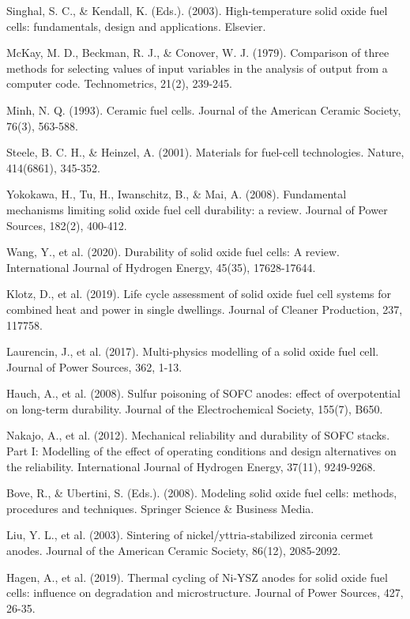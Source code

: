 \documentclass[10pt,conference]{IEEEtran}
\begin{document}
\begin{thebibliography}{99}

 Singhal, S. C., \& Kendall, K. (Eds.). (2003). High-temperature solid oxide fuel cells: fundamentals, design and applications. Elsevier.

 McKay, M. D., Beckman, R. J., \& Conover, W. J. (1979). Comparison of three methods for selecting values of input variables in the analysis of output from a computer code. Technometrics, 21(2), 239-245.

 Minh, N. Q. (1993). Ceramic fuel cells. Journal of the American Ceramic Society, 76(3), 563-588.

 Steele, B. C. H., \& Heinzel, A. (2001). Materials for fuel-cell technologies. Nature, 414(6861), 345-352.

 Yokokawa, H., Tu, H., Iwanschitz, B., \& Mai, A. (2008). Fundamental mechanisms limiting solid oxide fuel cell durability: a review. Journal of Power Sources, 182(2), 400-412.

 Wang, Y., et al. (2020). Durability of solid oxide fuel cells: A review. International Journal of Hydrogen Energy, 45(35), 17628-17644.

 Klotz, D., et al. (2019). Life cycle assessment of solid oxide fuel cell systems for combined heat and power in single dwellings. Journal of Cleaner Production, 237, 117758.

 Laurencin, J., et al. (2017). Multi-physics modelling of a solid oxide fuel cell. Journal of Power Sources, 362, 1-13.

 Hauch, A., et al. (2008). Sulfur poisoning of SOFC anodes: effect of overpotential on long-term durability. Journal of the Electrochemical Society, 155(7), B650.

 Nakajo, A., et al. (2012). Mechanical reliability and durability of SOFC stacks. Part I: Modelling of the effect of operating conditions and design alternatives on the reliability. International Journal of Hydrogen Energy, 37(11), 9249-9268.

 Bove, R., \& Ubertini, S. (Eds.). (2008). Modeling solid oxide fuel cells: methods, procedures and techniques. Springer Science \& Business Media.

 Liu, Y. L., et al. (2003). Sintering of nickel/yttria-stabilized zirconia cermet anodes. Journal of the American Ceramic Society, 86(12), 2085-2092.

 Hagen, A., et al. (2019). Thermal cycling of Ni-YSZ anodes for solid oxide fuel cells: influence on degradation and microstructure. Journal of Power Sources, 427, 26-35.


\end{thebibliography}
\end{document}
